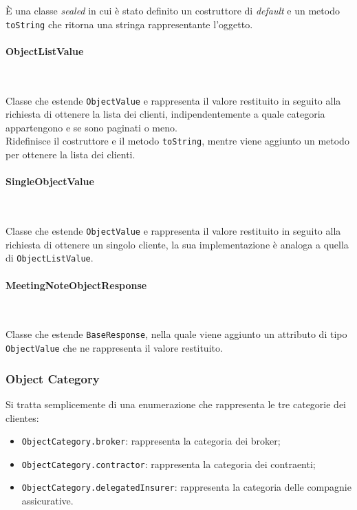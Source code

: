 \noindent È una classe \emph{sealed} \cite{site:sealed-class} in cui è stato definito un costruttore di \emph{default} e un metodo \lstinline{toString} che ritorna una stringa rappresentante l'oggetto.\\

\paragraph*{ObjectListValue} ~ \\
\label{par:object-list-value}

\noindent Classe che estende \lstinline{ObjectValue} e rappresenta il valore restituito in seguito alla richiesta di ottenere la lista dei clienti, indipendentemente a quale categoria appartengono e se sono paginati o meno.\\
Ridefinisce il costruttore e il metodo \lstinline{toString}, mentre viene aggiunto un metodo per ottenere la lista dei clienti.

\paragraph*{SingleObjectValue} ~ \\
\label{par:single-object-value}

\noindent Classe che estende \lstinline{ObjectValue} e rappresenta il valore restituito in seguito alla richiesta di ottenere un singolo cliente, la sua implementazione è analoga a quella di \lstinline{ObjectListValue}.

\paragraph*{MeetingNoteObjectResponse} ~ \\
\label{par:meeting-note-object-response}

\noindent Classe che estende \lstinline{BaseResponse}, nella quale viene aggiunto un attributo di tipo \lstinline{ObjectValue} che ne rappresenta il valore restituito.

\subsubsection*{Object Category}
\label{subsubsec:object-category}

Si tratta semplicemente di una enumerazione che rappresenta le tre categorie dei \glspl{cliente}\glsoccur:
\begin{itemize}
    \item \lstinline{ObjectCategory.broker}: rappresenta la categoria dei broker;
    \item \lstinline{ObjectCategory.contractor}: rappresenta la categoria dei contraenti;
    \item \lstinline{ObjectCategory.delegatedInsurer}: rappresenta la categoria delle compagnie assicurative.
\end{itemize}


